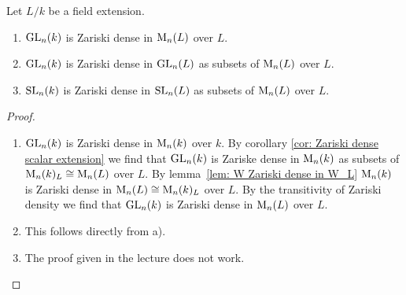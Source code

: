 \begin{prop}
  Let $L/k$ be a field extension.
  \begin{enumerate}[label=\emph{\alph*)},leftmargin=*]
    \item
      $\operatorname{GL}_n(k)$ is Zariski dense in $\operatorname{M}_n(L)$ over $L$.
    \item
      $\operatorname{GL}_n(k)$ is Zariski dense in $\operatorname{GL}_n(L)$ as subsets of $\operatorname{M}_n(L)$ over $L$.
    \item
      $\operatorname{SL}_n(k)$ is Zariski dense in $\operatorname{SL}_n(L)$ as subsets of $\operatorname{M}_n(L)$ over $L$.
  \end{enumerate}
\end{prop}
\begin{proof}
  \begin{enumerate}[label=\emph{\alph*)},leftmargin=*]
    \item
      $\operatorname{GL}_n(k)$ is Zariski dense in $\operatorname{M}_n(k)$ over $k$.
      By corollary \ref{cor: Zariski dense scalar extension} we find that $\operatorname{GL}_n(k)$ is Zariske dense in $\operatorname{M}_n(k)$ as subsets of $\operatorname{M}_n(k)_L \cong \operatorname{M}_n(L)$ over $L$.
      By \mbox{lemma \ref{lem: W Zariski dense in W_L}} $\operatorname{M}_n(k)$ is Zariski dense in $\operatorname{M}_n(L) \cong \operatorname{M}_n(k)_L$ over $L$.
      By the transitivity of Zariski density we find that $\operatorname{GL}_n(k)$ is Zariski dense in $\operatorname{M}_n(L)$ over $L$.
    \item
      This follows directly from a).
    \item
      The proof given in the lecture does not work.
    \qedhere
  \end{enumerate}
\end{proof}



